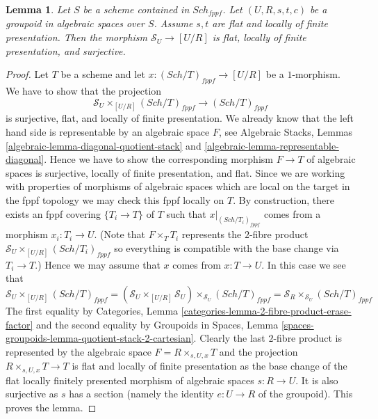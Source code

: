 \documentclass{stacks-project}
\theoremstyle{plain}
\newtheorem{lemma}[subsection]{Lemma}
\theoremstyle{definition}
\theoremstyle{remark}
\numberwithin{equation}{subsection}
\def\Sch{\mathit{Sch}}
\begin{document}
\begin{lemma}
\label{lemma-flat-quotient-flat-presentation}
Let $S$ be a scheme contained in $\Sch_{fppf}$.
Let $(U, R, s, t, c)$ be a groupoid in algebraic spaces over $S$.
Assume $s, t$ are flat and locally of finite presentation.
Then the morphism $\mathcal{S}_U \to [U/R]$ is flat, locally of
finite presentation, and surjective.
\end{lemma}

\begin{proof}
Let $T$ be a scheme and let $x : (\Sch/T)_{fppf} \to [U/R]$
be a $1$-morphism. We have to show that the projection
$$
\mathcal{S}_U \times_{[U/R]} (\Sch/T)_{fppf}
\longrightarrow
(\Sch/T)_{fppf}
$$
is surjective, flat, and locally of finite presentation.
We already know that the left hand side
is representable by an algebraic space $F$, see
Algebraic Stacks, Lemmas \ref{algebraic-lemma-diagonal-quotient-stack} and
\ref{algebraic-lemma-representable-diagonal}.
Hence we have to show the corresponding morphism $F \to T$ of
algebraic spaces is surjective, locally of finite presentation, and flat.
Since we are working with properties of morphisms of algebraic
spaces which are local on the target in the fppf topology we
may check this fppf locally on $T$. By construction, there exists
an fppf covering $\{T_i \to T\}$ of $T$ such that
$x|_{(\Sch/T_i)_{fppf}}$ comes from a morphism
$x_i : T_i \to U$. (Note that $F \times_T T_i$ represents the
$2$-fibre product $\mathcal{S}_U \times_{[U/R]} (\Sch/T_i)_{fppf}$
so everything is compatible with the base change via $T_i \to T$.)
Hence we may assume that $x$ comes from $x : T \to U$.
In this case we see that
$$
\mathcal{S}_U \times_{[U/R]} (\Sch/T)_{fppf}
=
(\mathcal{S}_U \times_{[U/R]} \mathcal{S}_U)
\times_{\mathcal{S}_U} (\Sch/T)_{fppf}
=
\mathcal{S}_R \times_{\mathcal{S}_U} (\Sch/T)_{fppf}
$$
The first equality by
Categories, Lemma \ref{categories-lemma-2-fibre-product-erase-factor}
and the second equality by
Groupoids in Spaces,
Lemma \ref{spaces-groupoids-lemma-quotient-stack-2-cartesian}.
Clearly the last $2$-fibre product is represented by the algebraic
space $F = R \times_{s, U, x} T$ and the projection
$R \times_{s, U, x} T \to T$ is flat and locally of finite presentation
as the base change of the flat locally finitely presented
morphism of algebraic spaces $s : R \to U$.
It is also surjective as $s$ has a section (namely the identity
$e : U \to R$ of the groupoid).
This proves the lemma.
\end{proof}
\end{document}
